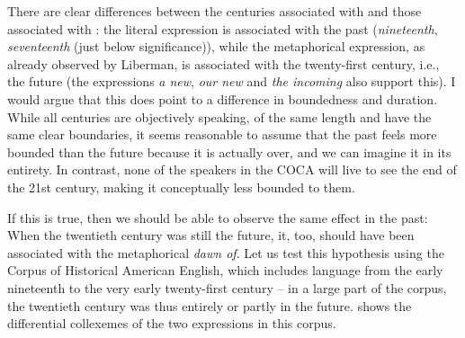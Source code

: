 There are clear differences between the centuries associated with  and those associated  with : the literal  expression is associated with the past (\textit{nineteenth}, \textit{seventeenth} (just below significance)), while the metaphorical  expression, as already observed by Liberman, is associated with the twenty\hyp{}first century, i.e., the future (the expressions \textit{a new}, \textit{our new} and \textit{the incoming} also support this). I would argue that this does point to a difference in boundedness and duration. While all centuries are objectively speaking, of the same length and have the same clear boundaries, it seems reasonable to assume that the past feels more bounded than the future because it is actually over, and we can imagine it in its entirety. In contrast, none of the speakers in the COCA will live to see the end of the 21st century, making it conceptually less bounded to them.

If this is true, then we should be able to observe the same effect in the past: When the twentieth century was still the future, it, too, should have been associated  with the metaphorical  \textit{dawn of}. Let us test this hypothesis using the Corpus of Historical American English, which includes language from the early nineteenth to the very early twenty\hyp{}first century -- in a large part of the corpus, the twentieth century was thus entirely or partly in the future.  shows the differential collexemes  of the two expressions in this corpus.


